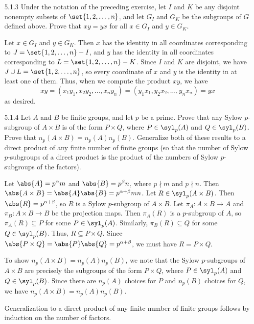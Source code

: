\begin{exercise}{5.1.3}
    Under the notation of the preceding exercise, let $I$ and $K$ be any disjoint nonempty subsets of $\set{1, 2, \ldots, n}$, and let $G_I$ and $G_K$ be the subgroups of $G$ defined above.
	Prove that $xy = yx$ for all $x \in G_I$ and $y \in G_K$.
\end{exercise}

\begin{sol}
    Let $x \in G_I$ and $y \in G_K$.
	Then $x$ has the identity in all coordinates corresponding to $J = \set{1, 2, \ldots, n} - I$, and $y$ has the identity in all coordinates corresponding to $L = \set{1, 2, \ldots, n} - K$.
	Since $I$ and $K$ are disjoint, we have $J \cup L = \set{1, 2, \ldots, n}$, so every coordinate of $x$ and $y$ is the identity in at least one of them.
	Thus, when we compute the product $xy$, we have
    \[
    	xy = (x_1y_1, x_2y_2, \ldots, x_ny_n) = (y_1x_1, y_2x_2, \ldots, y_nx_n) = yx
    \]
    as desired.
\end{sol}

\begin{exercise}{5.1.4}
    Let $A$ and $B$ be finite groups, and let $p$ be a prime.
	Prove that any Sylow $p$-subgroup of $A \times B$ is of the form $P \times Q$, where $P \in \syl_p(A)$ and $Q \in \syl_p(B)$.
	Prove that $n_p(A \times B) = n_p(A)n_p(B)$.
	Generalize both of these results to a direct product of any finite number of finite groups (so that the number of Sylow $p$-subgroups of a direct product is the product of the numbers of Sylow $p$-subgroups of the factors).
\end{exercise}

\begin{sol}
    Let $\abs{A} = p^\alpha m$ and $\abs{B} = p^\beta n$, where $p \nmid m$ and $p \nmid n$.
	Then $\abs{A \times B} = \abs{A}\abs{B} = p^{\alpha + \beta}mn$.
	Let $R \in \syl_p(A \times B)$.
	Then $\abs{R} = p^{\alpha + \beta}$, so $R$ is a Sylow $p$-subgroup of $A \times B$.
	Let $\pi_A \colon A \times B \to A$ and $\pi_B \colon A \times B \to B$ be the projection maps.
	Then $\pi_A(R)$ is a $p$-subgroup of $A$, so $\pi_A(R) \subseteq P$ for some $P \in \syl_p(A)$.
	Similarly, $\pi_B(R) \subseteq Q$ for some $Q \in \syl_p(B)$.
	Thus, $R \subseteq P \times Q$.
	Since $\abs{P \times Q} = \abs{P}\abs{Q} = p^{\alpha + \beta}$, we must have $R = P \times Q$.

    To show $n_p(A \times B) = n_p(A)n_p(B)$, we note that the Sylow $p$-subgroups of $A \times B$ are precisely the subgroups of the form $P \times Q$, where $P \in \syl_p(A)$ and $Q \in \syl_p(B)$.
	Since there are $n_p(A)$ choices for $P$ and $n_p(B)$ choices for $Q$, we have $n_p(A \times B) = n_p(A)n_p(B)$.

	Generalization to a direct product of any finite number of finite groups follows by induction on the number of factors.
\end{sol}

